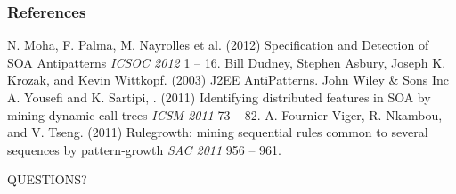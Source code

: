 \documentclass{beamer}
\begin{document}
\begin{frame}
\frametitle{References}
\footnotesize{
\begin{thebibliography}{99} %
 N. Moha, F. Palma, M. Nayrolles et al. (2012)
\newblock Specification and Detection of
SOA Antipatterns
\newblock \emph{ICSOC 2012} 1 -- 16.
 Bill Dudney, Stephen Asbury, Joseph K. Krozak, and Kevin Wittkopf. (2003)
\newblock J2EE AntiPatterns. John Wiley \& Sons Inc
 A. Yousefi and K. Sartipi,
. (2011)
\newblock Identifying distributed features in SOA by
mining dynamic call trees
\newblock \emph{ICSM 2011} 73 -- 82.
 A. Fournier-Viger, R. Nkambou, and V. Tseng. (2011)
\newblock Rulegrowth: mining
sequential rules common to several sequences by pattern-growth
\newblock \emph{SAC 2011} 956 -- 961.

\end{thebibliography}
}
\end{frame}



\begin{frame}
\Huge{\centerline{QUESTIONS?}}
\end{frame}

\end{document}

